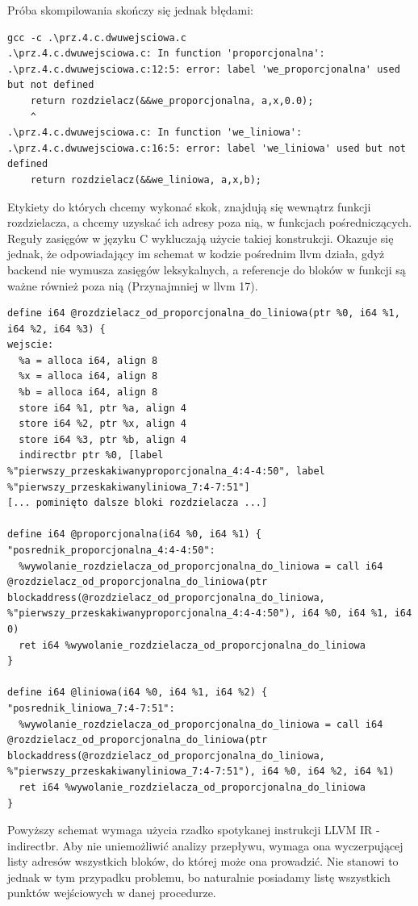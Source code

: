 Próba skompilowania skończy się jednak błędami:
\begin{lstlisting}
gcc -c .\prz.4.c.dwuwejsciowa.c
.\prz.4.c.dwuwejsciowa.c: In function 'proporcjonalna':
.\prz.4.c.dwuwejsciowa.c:12:5: error: label 'we_proporcjonalna' used but not defined
 	return rozdzielacz(&&we_proporcjonalna, a,x,0.0);
 	^
.\prz.4.c.dwuwejsciowa.c: In function 'we_liniowa':
.\prz.4.c.dwuwejsciowa.c:16:5: error: label 'we_liniowa' used but not defined
 	return rozdzielacz(&&we_liniowa, a,x,b);
\end{lstlisting}
Etykiety do których chcemy wykonać skok, znajdują się wewnątrz funkcji rozdzielacza, a chcemy uzyskać ich adresy poza nią,  w funkcjach pośredniczących. Reguły zasięgów w języku C wykluczają użycie takiej konstrukcji. Okazuje się jednak, że odpowiadający im schemat w kodzie pośrednim llvm  działa, gdyż backend nie wymusza zasięgów leksykalnych, a referencje do bloków w funkcji są ważne również poza nią (Przynajmniej w llvm  17).
\begin{lstlisting}
define i64 @rozdzielacz_od_proporcjonalna_do_liniowa(ptr %0, i64 %1, i64 %2, i64 %3) {
wejscie:
  %a = alloca i64, align 8
  %x = alloca i64, align 8
  %b = alloca i64, align 8
  store i64 %1, ptr %a, align 4
  store i64 %2, ptr %x, align 4
  store i64 %3, ptr %b, align 4
  indirectbr ptr %0, [label %"pierwszy_przeskakiwanyproporcjonalna_4:4-4:50", label %"pierwszy_przeskakiwanyliniowa_7:4-7:51"]
[... pominięto dalsze bloki rozdzielacza ...]

define i64 @proporcjonalna(i64 %0, i64 %1) {
"posrednik_proporcjonalna_4:4-4:50":
  %wywolanie_rozdzielacza_od_proporcjonalna_do_liniowa = call i64 @rozdzielacz_od_proporcjonalna_do_liniowa(ptr blockaddress(@rozdzielacz_od_proporcjonalna_do_liniowa, %"pierwszy_przeskakiwanyproporcjonalna_4:4-4:50"), i64 %0, i64 %1, i64 0)
  ret i64 %wywolanie_rozdzielacza_od_proporcjonalna_do_liniowa
}

define i64 @liniowa(i64 %0, i64 %1, i64 %2) {
"posrednik_liniowa_7:4-7:51":
  %wywolanie_rozdzielacza_od_proporcjonalna_do_liniowa = call i64 @rozdzielacz_od_proporcjonalna_do_liniowa(ptr blockaddress(@rozdzielacz_od_proporcjonalna_do_liniowa, %"pierwszy_przeskakiwanyliniowa_7:4-7:51"), i64 %0, i64 %2, i64 %1)
  ret i64 %wywolanie_rozdzielacza_od_proporcjonalna_do_liniowa
}
\end{lstlisting}
Powyższy schemat wymaga użycia rzadko spotykanej instrukcji LLVM IR - indirectbr. Aby nie uniemożliwić analizy przepływu, wymaga ona wyczerpującej listy adresów wszystkich bloków, do której może ona prowadzić. Nie stanowi to jednak w tym przypadku problemu, bo naturalnie posiadamy listę wszystkich punktów wejściowych w danej procedurze.

